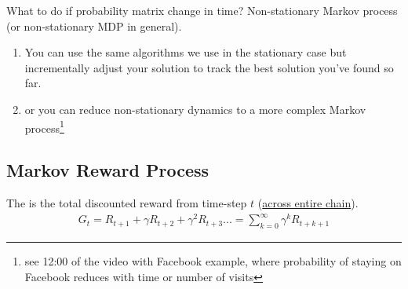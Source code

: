 \begin{notebox}
What to do if probability matrix change in time? Non-stationary Markov process (or non-stationary MDP in general).


\begin{enumerate}
	\item  You can use the same algorithms we use in the stationary case but incrementally adjust your solution to track the best solution you've found so far.
	\item or you can reduce non-stationary dynamics to a more complex Markov process\footnote{see 12:00 of the video with Facebook example, where probability of staying on Facebook reduces with time or number of visits}
\end{enumerate}
\end{notebox}


\subsection{Markov Reward Process}


The  is the total discounted reward from time-step $t$ (\underline{across entire chain}).
\begin{align}
	G_t = R_{t+1}+ \gamma R_{t+2} + \gamma^2 R_{t+3} ... = \sum_{k=0}^{\infty} \gamma^k R_{t+k+1}
\end{align}

